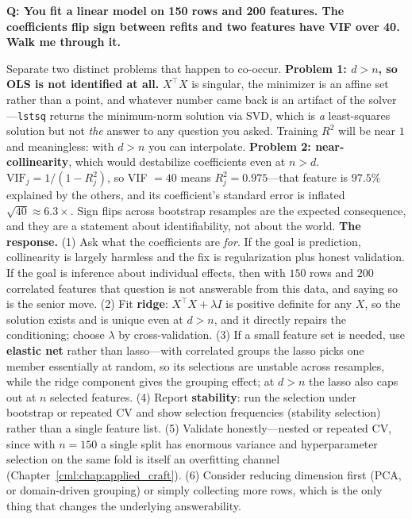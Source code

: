 \begin{interviewq}
\textbf{Q: You fit a linear model on 150 rows and 200 features. The coefficients flip sign between refits and two features have VIF over 40. Walk me through it.}

 \quad {} \quad \badgefreq{\freqmed}

\stronganswer

Separate two distinct problems that happen to co-occur. \textbf{Problem 1: $d > n$, so OLS is not identified at all.} $X^{\top}X$ is singular, the minimizer is an affine set rather than a point, and whatever number came back is an artifact of the solver---\texttt{lstsq} returns the minimum-norm solution via SVD, which is \emph{a} least-squares solution but not \emph{the} answer to any question you asked. Training $R^2$ will be near $1$ and meaningless: with $d>n$ you can interpolate. \textbf{Problem 2: near-collinearity}, which would destabilize coefficients even at $n>d$. $\text{VIF}_j = 1/(1-R_j^2)$, so VIF $=40$ means $R_j^2 = 0.975$---that feature is $97.5\%$ explained by the others, and its coefficient's standard error is inflated $\sqrt{40}\approx 6.3\times$. Sign flips across bootstrap resamples are the expected consequence, and they are a statement about identifiability, not about the world. \textbf{The response.} (1) Ask what the coefficients are \emph{for}. If the goal is prediction, collinearity is largely harmless and the fix is regularization plus honest validation. If the goal is inference about individual effects, then with $150$ rows and $200$ correlated features that question is not answerable from this data, and saying so is the senior move. (2) Fit \textbf{ridge}: $X^{\top}X+\lambda I$ is positive definite for any $X$, so the solution exists and is unique even at $d>n$, and it directly repairs the conditioning; choose $\lambda$ by cross-validation. (3) If a small feature set is needed, use \textbf{elastic net} rather than lasso---with correlated groups the lasso picks one member essentially at random, so its selections are unstable across resamples, while the ridge component gives the grouping effect; at $d>n$ the lasso also caps out at $n$ selected features. (4) Report \textbf{stability}: run the selection under bootstrap or repeated CV and show selection frequencies (stability selection) rather than a single feature list. (5) Validate honestly---nested or repeated CV, since with $n=150$ a single split has enormous variance and hyperparameter selection on the same fold is itself an overfitting channel (Chapter~\ref{cml:chap:applied_craft}). (6) Consider reducing dimension first (PCA, or domain-driven grouping) or simply collecting more rows, which is the only thing that changes the underlying answerability.


\end{interviewq}
